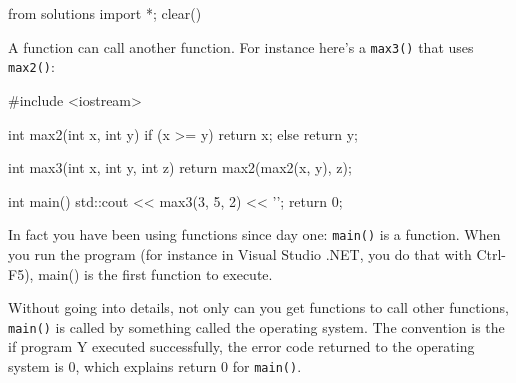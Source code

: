 \begin{python0}
from solutions import *; clear()
\end{python0}

A function can call another function. For instance here's a \texttt{max3()} that uses \texttt{max2()}:

\begin{consolethree}[escapeinside=||]
#include <iostream>

int max2(int x, int y)
{
    if (x >= y)
    {
        return x;
    }
    else
    {
        return y;
    }
}

int max3(int x, int y, int z)
{
    return max2(max2(x, y), z);
}

int main()
{
    std::cout << max3(3, 5, 2) << '\n';
    return 0;
}
\end{consolethree}

In fact you have been using functions since day one: \verb!main()! is a function. When you run the program (for instance in Visual Studio .NET, you do that with Ctrl-F5), main() is the first function to execute.

Without going into details, not only can you get functions to call other functions, \texttt{main()} is called by something called the operating system. The convention is the if program Y executed successfully, the error code returned to the operating system is 0, which explains return 0 for \texttt{main()}.


